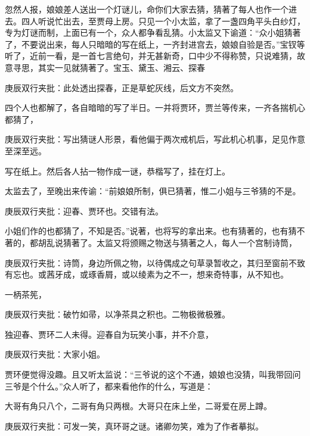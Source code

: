 \begin{parag}
    忽然人报，娘娘差人送出一个灯谜儿，命你们大家去猜，猜著了每人也作一个进去。四人听说忙出去，至贾母上房。只见一个小太监，拿了一盏四角平头白纱灯，专为灯谜而制，上面已有一个，众人都争看乱猜。小太监又下谕道：“众小姐猜著了，不要说出来，每人只暗暗的写在纸上，一齐封进宫去，娘娘自验是否。”宝钗等听了，近前一看，是一首七言绝句，并无甚新奇，口中少不得称赞，只说难猜，故意寻思，其实一见就猜著了。宝玉、黛玉、湘云、探春\begin{note}庚辰双行夹批：此处透出探春，正是草蛇灰线，后文方不突然。\end{note}四个人也都解了，各自暗暗的写了半日。一并将贾环，贾兰等传来，一齐各揣机心都猜了，\begin{note}庚辰双行夹批：写出猜谜人形景，看他偏于两次戒机后，写此机心机事，足见作意至深至远。\end{note}写在纸上。然后各人拈一物作成一谜，恭楷写了，挂在灯上。
\end{parag}


\begin{parag}
    太监去了，至晚出来传谕：“前娘娘所制，俱已猜著，惟二小姐与三爷猜的不是。\begin{note}庚辰双行夹批：迎春、贾环也。交错有法。\end{note}小姐们作的也都猜了，不知是否。”说著，也将写的拿出来。也有猜著的，也有猜不著的，都胡乱说猜著了。太监又将颁赐之物送与猜著之人，每人一个宫制诗筒，\begin{note}庚辰双行夹批：诗筒，身边所佩之物，以待偶成之句草录暂收之，其归至窗前不致有忘也。或茜牙成，或琢香屑，或以绫素为之不一，想来奇特事，从不知也。\end{note}一柄茶筅，\begin{note}庚辰双行夹批：破竹如帚，以净茶具之积也。二物极微极雅。\end{note}独迎春、贾环二人未得。迎春自为玩笑小事，并不介意，\begin{note}庚辰双行夹批：大家小姐。\end{note}贾环便觉得没趣。且又听太监说：“三爷说的这个不通，娘娘也没猜，叫我带回问三爷是个什么。”众人听了，都来看他作的什么，写道是：
\end{parag}


\begin{parag}
    大哥有角只八个，二哥有角只两根。大哥只在床上坐，二哥爱在房上蹲。\begin{note}庚辰双行夹批：可发一笑，真环哥之谜。诸卿勿笑，难为了作者摹拟。\end{note}
\end{parag}


